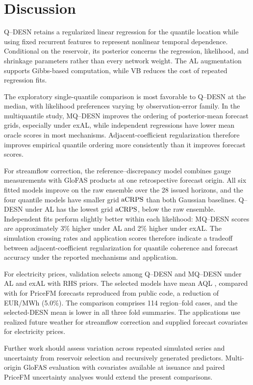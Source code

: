 \section{Discussion}
\label{qdesn2026:sec:discussion}

Q--DESN retains a regularized linear regression for the quantile location
while using fixed recurrent features to represent nonlinear temporal
dependence. Conditional on the reservoir, its posterior concerns the regression,
likelihood, and shrinkage parameters rather than every network weight. The AL augmentation supports
Gibbs-based computation, while VB reduces the cost of repeated regression fits.

The exploratory single-quantile comparison is most favorable to Q--DESN at the
median, with likelihood preferences varying by observation-error family. In
the multiquantile study, MQ--DESN improves the ordering of posterior-mean
forecast grids, especially under exAL, while independent regressions have
lower mean oracle scores in most mechanisms. Adjacent-coefficient
regularization therefore improves empirical quantile ordering more consistently
than it improves forecast scores.

For streamflow correction, the reference--discrepancy model combines gauge
measurements with
GloFAS products at one retrospective forecast origin. All six fitted models
improve on the raw ensemble over the 28 issued horizons, and the four quantile
models have smaller grid \(\operatorname{aCRPS}\) than both Gaussian baselines. Q--DESN under
AL has the lowest grid \(\operatorname{aCRPS}\), \GlofasApplicationCurrentAcrpsReduction{}
below the raw
ensemble. Independent fits perform slightly better within each likelihood:
MQ--DESN scores are approximately 3\% higher under AL and 2\% higher under
exAL. The simulation crossing rates and application scores therefore indicate
a tradeoff between adjacent-coefficient regularization for quantile coherence
and forecast accuracy under the reported mechanisms and application.

For electricity prices, validation selects among Q--DESN and MQ--DESN under
AL and exAL with RHS priors. The selected models have mean AQL
\PricefmFullMeanSelectedAql{}, compared with
\PricefmFullMeanPricefmAql{} for PriceFM forecasts reproduced from public
code, a reduction of \PricefmFullMeanReductionAql{} EUR/MWh (5.0\%). The
comparison comprises 114 region--fold cases, and the selected-DESN mean is
lower in all three fold summaries. The applications use realized future
weather for streamflow correction and supplied forecast covariates for
electricity prices.

Further work should assess variation across repeated simulated series and
uncertainty from reservoir selection and recursively generated predictors.
Multi-origin GloFAS evaluation with covariates available at issuance and
paired PriceFM uncertainty analyses would extend the present comparisons.
